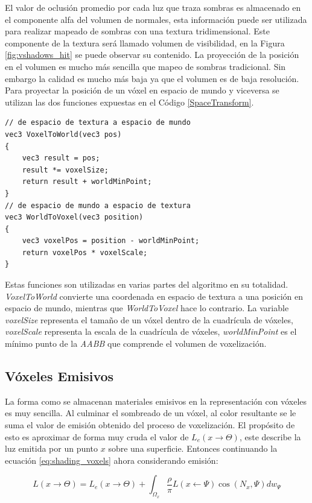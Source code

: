 El valor de oclusión promedio por cada luz que traza sombras es almacenado en el componente alfa del volumen de normales, esta información puede ser utilizada para realizar mapeado de sombras con una textura tridimensional. Este componente de la textura será llamado volumen de visibilidad, en la Figura \ref{fig:vshadows_hit} se puede observar su contenido. La proyección de la posición en el volumen es mucho más sencilla que mapeo de sombras tradicional. Sin embargo la calidad es mucho más baja ya que el volumen es de baja resolución. Para proyectar la posición de un vóxel en espacio de mundo y viceversa se utilizan las dos funciones expuestas en el Código \ref{SpaceTransform}.
\\
\begin{lstlisting}[caption={Transformación de espacio entre coordenadas de textura y posiciones de mundo.}, label=SpaceTransform]
// de espacio de textura a espacio de mundo
vec3 VoxelToWorld(vec3 pos)
{
	vec3 result = pos;
	result *= voxelSize;
	return result + worldMinPoint;
}
// de espacio de mundo a espacio de textura
vec3 WorldToVoxel(vec3 position)
{
    vec3 voxelPos = position - worldMinPoint;
    return voxelPos * voxelScale;
}
\end{lstlisting}

Estas funciones son utilizadas en varias partes del algoritmo en su totalidad. \emph{VoxelToWorld} convierte una coordenada en espacio de textura a una posición en espacio de mundo, mientras que \emph{WorldToVoxel} hace lo contrario. La variable \emph{voxelSize} representa el tamaño de un vóxel dentro de la cuadrícula de vóxeles, \emph{voxelScale} representa la escala de la cuadrícula de vóxeles, \emph{worldMinPoint} es el mínimo punto de la \emph{AABB} que comprende el volumen de voxelización.

\subsection{Vóxeles Emisivos}
La forma como se almacenan materiales emisivos en la representación con vóxeles es muy sencilla. Al culminar el sombreado de un vóxel, al color resultante se le suma el valor de emisión obtenido del proceso de voxelización. El propósito de esto es aproximar de forma muy cruda el valor de $L_e(x\to\Theta)$, este describe la luz emitida por un punto $x$ sobre una superficie. Entonces continuando la ecuación \ref{eq:shading_voxels} ahora considerando emisión:

\begin{equation}
		L(x\to\Theta) = L_e(x\to\Theta) + \int_{\Omega_{x}}{\frac{\rho}{\pi}L(x\gets\Psi)\cos(N_{x}, \Psi)dw_{\Psi}}
\end{equation}

